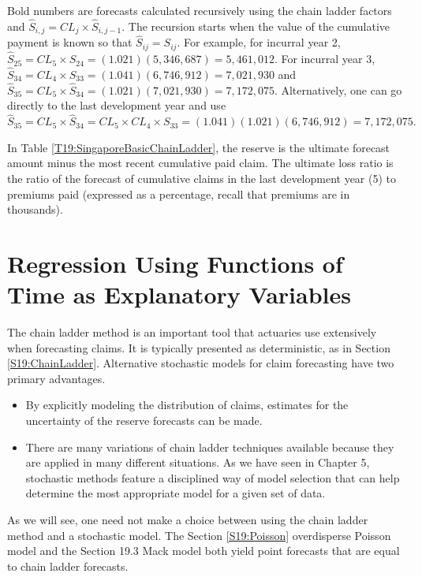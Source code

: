 Bold numbers are forecasts calculated recursively using the chain
ladder factors and $\widehat{S}_{i,j} = CL_{j} \times
\widehat{S}_{i,j-1}.$ The recursion starts when the value of the
cumulative payment is known so that $\widehat{S}_{ij}=S_{ij}$. For
example, for incurral year 2, $\widehat{S}_{25} = CL_5 \times S_{24}
= (1.021)(5,346,687)=5,461,012$. For incurral year 3,
$\widehat{S}_{34} = CL_4 \times S_{33} =
(1.041)(6,746,912)=7,021,930$ and $\widehat{S}_{35} = CL_5 \times
\widehat{S}_{34} = (1.021)(7,021,930)=7,172,075$. Alternatively, one
can go directly to the last development year and use
$\widehat{S}_{35} = CL_5 \times \widehat{S}_{34} = CL_5 \times CL_4
\times S_{33} = (1.041)(1.021)(6,746,912)=7,172,075.$

In Table \ref{T19:SingaporeBasicChainLadder}, the reserve is the
ultimate forecast amount minus the most recent cumulative paid
claim. The ultimate loss ratio is the ratio of the forecast of
cumulative claims in the last development year (5) to premiums paid
(expressed as a percentage, recall that premiums are in thousands).

\section{Regression Using Functions of Time as Explanatory
Variables}\label{S19:RegressionFunction}

The chain ladder method is an important tool that actuaries use
extensively when forecasting claims. It is typically presented as
deterministic, as in Section \ref{S19:ChainLadder}. Alternative
stochastic models for claim forecasting have two primary advantages.
\begin{itemize}
\item By explicitly modeling the distribution of claims, estimates
for the uncertainty of the reserve forecasts can be made.
\item There are
many variations of chain ladder techniques available because they
are applied in many different situations. As we have seen in Chapter
5, stochastic methods feature a disciplined way of model selection
that can help determine the most appropriate model for a given set
of data. \end{itemize}

As we will see, one need not make a choice between using the chain
ladder method and a stochastic model. The Section \ref{S19:Poisson}
overdisperse Poisson model and the Section 19.3 Mack model both
yield point forecasts that are equal to chain ladder forecasts.

